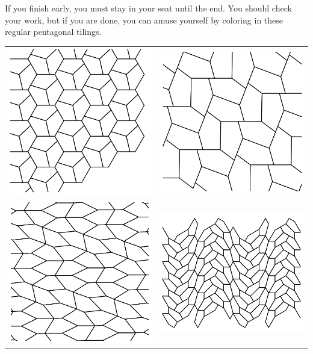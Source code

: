 \documentclass[addpoints,12pt]{exam}
\begin{document}
If you finish early, you must stay in your seat until the end. You should check your work, but if you are done, you can amuse yourself by coloring in these regular pentagonal tilings.

\begin{tabular}{cc}
\includegraphics[width=.4\textwidth]{T1} & \includegraphics[width=.4\textwidth]{T2} \\
\includegraphics[width=.4\textwidth]{T3} &\includegraphics[width=.4\textwidth]{T15} 
\end{tabular}
\end{document}
